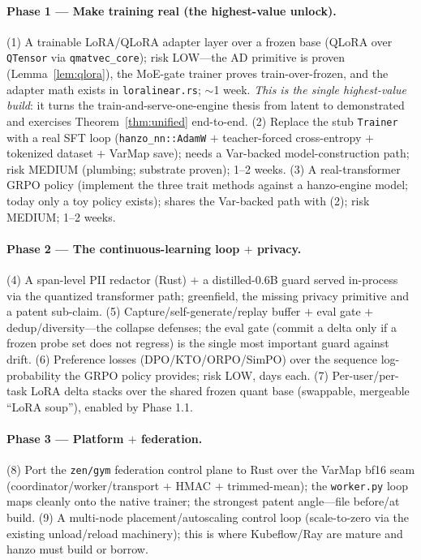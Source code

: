 \documentclass[11pt]{article}
\begin{document}
\paragraph{Phase 1 --- Make training real (the highest-value unlock).} (1) A trainable LoRA/QLoRA adapter layer over a frozen base (QLoRA over \texttt{QTensor} via \texttt{qmatvec\_core}); risk LOW---the AD primitive is proven (Lemma~\ref{lem:qlora}), the MoE-gate trainer proves train-over-frozen, and the adapter math exists in \texttt{loralinear.rs}; $\sim$1 week. \emph{This is the single highest-value build}: it turns the train-and-serve-one-engine thesis from latent to demonstrated and exercises Theorem~\ref{thm:unified} end-to-end. (2) Replace the stub \texttt{Trainer} with a real SFT loop (\texttt{hanzo\_nn::AdamW} $+$ teacher-forced cross-entropy $+$ tokenized dataset $+$ VarMap save); needs a Var-backed model-construction path; risk MEDIUM (plumbing; substrate proven); 1--2 weeks. (3) A real-transformer GRPO policy (implement the three trait methods against a hanzo-engine model; today only a toy policy exists); shares the Var-backed path with (2); risk MEDIUM; 1--2 weeks.

\paragraph{Phase 2 --- The continuous-learning loop $+$ privacy.} (4) A span-level PII redactor (Rust) $+$ a distilled-0.6B guard served in-process via the quantized transformer path; greenfield, the missing privacy primitive and a patent sub-claim. (5) Capture/self-generate/replay buffer $+$ eval gate $+$ dedup/diversity---the collapse defenses; the eval gate (commit a delta only if a frozen probe set does not regress) is the single most important guard against drift. (6) Preference losses (DPO/KTO/ORPO/SimPO) over the sequence log-probability the GRPO policy provides; risk LOW, days each. (7) Per-user/per-task LoRA delta stacks over the shared frozen quant base (swappable, mergeable ``LoRA soup''), enabled by Phase 1.1.

\paragraph{Phase 3 --- Platform $+$ federation.} (8) Port the \texttt{zen/gym} federation control plane to Rust over the VarMap bf16 seam (coordinator/worker/transport $+$ HMAC $+$ trimmed-mean); the \texttt{worker.py} loop maps cleanly onto the native trainer; the strongest patent angle---file before/at build. (9) A multi-node placement/autoscaling control loop (scale-to-zero via the existing unload/reload machinery); this is where Kubeflow/Ray are mature and hanzo must build or borrow.
\end{document}
